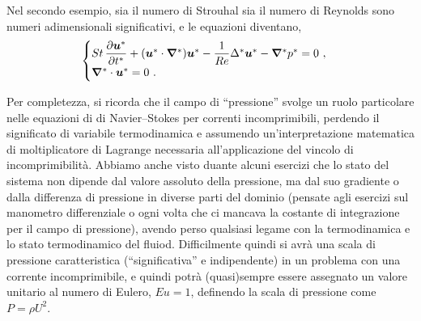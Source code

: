 Nel secondo esempio, sia il numero di Strouhal sia il numero di Reynolds sono numeri adimensionali significativi, e le equazioni diventano,
\begin{equation}
\begin{cases}
 St \, \dfrac{\partial{\bm{u}^*}}{\partial{t^*}} + ( \bm{u}^* \cdot \bm{\nabla}^* ) \bm{u}^* 
 - \dfrac{1}{Re} \Delta^* \bm{u}^* - \bm{\nabla}^* p^* = 0 \ , \\
 \bm{\nabla}^* \cdot \bm{u}^* = 0 \ .
\end{cases}
\end{equation}

Per completezza, si ricorda che il campo di ``pressione'' svolge un ruolo particolare nelle equazioni di di Navier--Stokes per correnti incomprimibili, perdendo il significato di variabile termodinamica e assumendo un'interpretazione matematica di moltiplicatore di Lagrange necessaria all'applicazione del vincolo di incomprimibilità. Abbiamo anche visto duante alcuni esercizi che lo stato del sistema non dipende dal valore assoluto della pressione, ma dal suo gradiente o dalla differenza di pressione in diverse parti del dominio (pensate agli esercizi sul manometro differenziale o ogni volta che ci mancava la costante di integrazione per il campo di pressione), avendo perso qualsiasi legame con la termodinamica e lo stato termodinamico del fluiod. Difficilmente quindi si avrà una scala di pressione caratteristica (``significativa'' e indipendente) in un problema con una corrente incomprimibile, e quindi potrà (quasi)sempre essere assegnato un valore unitario al numero di Eulero, $Eu = 1$, definendo la scala di pressione come $P = \rho U^2$.
